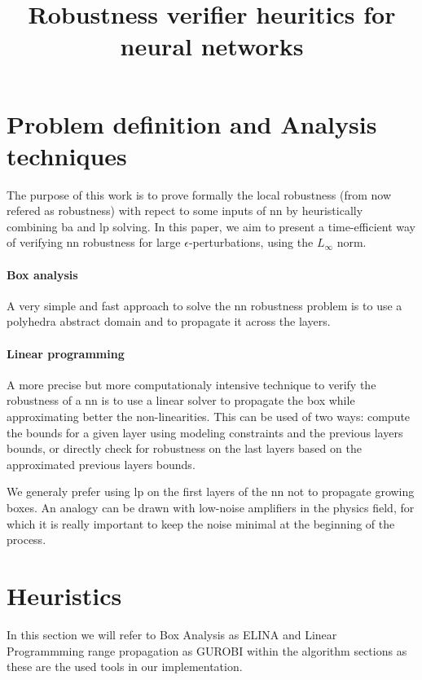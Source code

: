 \documentclass[8pt,a4paper]{article}
\title{
	Robustness verifier heuritics for neural networks
}
\begin{document}
\maketitle

\section{Problem definition and Analysis techniques}

The purpose of this work is to prove formally the local robustness (from now refered as robustness) with repect to some inputs of \gls{nn} by heuristically combining \gls{ba} and \gls{lp} solving. 
In this paper, we aim to present a time-efficient way of verifying \gls{nn} robustness for large $\epsilon$-perturbations, using the $L_\infty$ norm.

\paragraph*{Box analysis}

A very simple and fast approach to solve the \gls{nn} robustness problem is to use a polyhedra abstract domain and to propagate it across the layers.

\paragraph*{Linear programming}

A more precise but more computationaly intensive technique to verify the robustness of a \gls{nn} is to use a linear solver to propagate the box while approximating better the non-linearities. This can be used of two ways: compute the bounds for a given layer using modeling constraints and the previous layers bounds, or directly check for robustness on the last layers based on the approximated previous layers bounds.

We generaly prefer using \gls{lp} on the first layers of the \gls{nn} not to propagate growing boxes. An analogy can be drawn with low-noise amplifiers in the physics field, for which it is really important to keep the noise minimal at the beginning of the process.

\section{Heuristics}

In this section we will refer to Box Analysis as ELINA and Linear Programmming range propagation as GUROBI within the algorithm sections as these are the used tools in our implementation.
\end{document}
